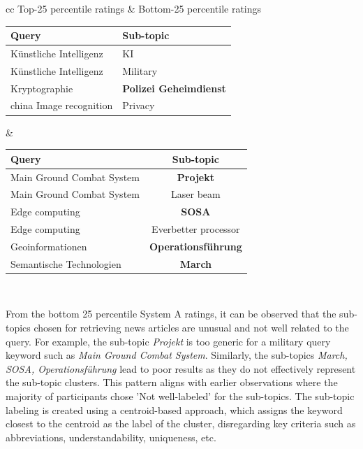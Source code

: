 \begin{center}
	\label{tab:queries_question_234}
	\begin{tabular}{ cc }   %
		Top-25 percentile ratings & Bottom-25 percentile ratings \\  
		\begin{tabularx}{.4\textwidth}{|Y|Y|}
			\hline
			Query  & Sub-topic \\
			\hline
			Künstliche Intelligenz & KI  \\
			\hline
			Künstliche Intelligenz & Military \\
			\hline
			Kryptographie & \textbf{Polizei Geheimdienst}\\
			\hline
			china Image recognition & Privacy \\
			\hline
		\end{tabularx}&  %
		\begin{tabularx}{.55\textwidth}{|Y|c|}
			\hline
			Query  & Sub-topic \\
			\hline
			Main Ground Combat System & \textbf{Projekt}  \\
			\hline
			Main Ground Combat System & Laser beam \\
			\hline
			Edge computing & \textbf{SOSA} \\
			\hline
			Edge computing & Everbetter processor \\
			\hline
			Geoinformationen & \textbf{Operationsführung} \\
			\hline
			Semantische Technologien & \textbf{March} \\
			\hline
		\end{tabularx}\\
	\end{tabular}
\end{center}

From the bottom 25 percentile System A ratings, it can be observed that the sub-topics chosen for retrieving news articles are unusual and not well related to the query. For example, the sub-topic \textit{Projekt} is too generic for a military query keyword such as \textit{Main Ground Combat System}. Similarly, the sub-topics \textit{March, SOSA, Operationsführung} lead to poor results as they do not effectively represent the sub-topic clusters. This pattern aligns with earlier observations where the majority of participants chose 'Not well-labeled' for the sub-topics. The sub-topic labeling is created using a centroid-based approach, which assigns the keyword closest to the centroid as the label of the cluster, disregarding key criteria such as abbreviations, understandability, uniqueness, etc.

